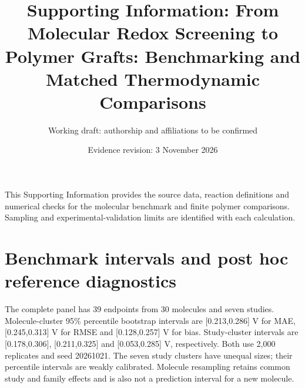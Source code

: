 \documentclass[11pt]{article}
\title{Supporting Information: From Molecular Redox Screening to Polymer Grafts: Benchmarking and Matched Thermodynamic Comparisons}
\author{Working draft: authorship and affiliations to be confirmed}
\date{Evidence revision: 3 November 2026}
\begin{document}
\maketitle
\noindent This Supporting Information provides the source data, reaction definitions and numerical checks for the molecular benchmark and finite polymer comparisons. Sampling and experimental-validation limits are identified with each calculation.
\section{Benchmark intervals and post hoc reference diagnostics}
The complete panel has 39 endpoints from 30 molecules and seven studies. Molecule-cluster 95\% percentile bootstrap intervals are [0.213,0.286] V for MAE, [0.245,0.313] V for RMSE and [0.128,0.257] V for bias. Study-cluster intervals are [0.178,0.306], [0.211,0.325] and [0.053,0.285] V, respectively. Both use 2,000 replicates and seed 20261021. The seven study clusters have unequal sizes; their percentile intervals are weakly calibrated. Molecule resampling retains common study and family effects and is also not a prediction interval for a new molecule.
\end{document}
